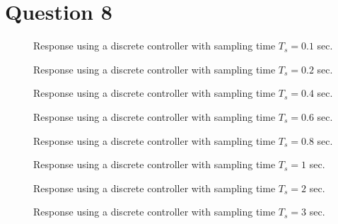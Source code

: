 \section{Question 8}

\begin{figure}[H]\centering
	\centering
	\scalebox{1}{}
  \caption{Response using a discrete controller with sampling time $T_s = 0.1$ sec.}
  \label{fig:Q8.01}
\end{figure}

\begin{figure}[H]\centering
	\centering
	\scalebox{1}{}
  \caption{Response using a discrete controller with sampling time $T_s = 0.2$ sec.}
  \label{fig:Q8.02}
\end{figure}

\begin{figure}[H]\centering
	\centering
	\scalebox{1}{}
  \caption{Response using a discrete controller with sampling time $T_s = 0.4$ sec.}
  \label{fig:Q8.04}
\end{figure}

\begin{figure}[H]\centering
	\centering
	\scalebox{1}{}
  \caption{Response using a discrete controller with sampling time $T_s = 0.6$ sec.}
  \label{fig:Q8.06}
\end{figure}

\begin{figure}[H]\centering
	\centering
	\scalebox{1}{}
  \caption{Response using a discrete controller with sampling time $T_s = 0.8$ sec.}
  \label{fig:Q8.08}
\end{figure}

\begin{figure}[H]\centering
	\centering
	\scalebox{1}{}
  \caption{Response using a discrete controller with sampling time $T_s = 1$ sec.}
  \label{fig:Q8.1}
\end{figure}

\begin{figure}[H]\centering
	\centering
	\scalebox{1}{}
  \caption{Response using a discrete controller with sampling time $T_s = 2$ sec.}
  \label{fig:Q8.2}
\end{figure}

\begin{figure}[H]\centering
	\centering
	\scalebox{1}{}
  \caption{Response using a discrete controller with sampling time $T_s = 3$ sec.}
  \label{fig:Q8.3}
\end{figure}

